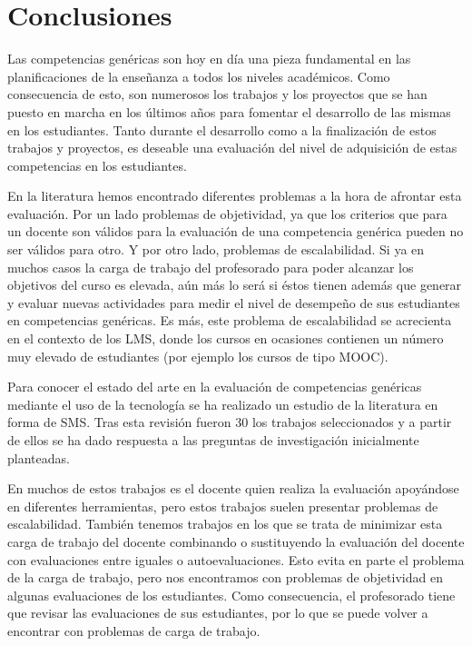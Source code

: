 \section{Conclusiones}

Las competencias genéricas son hoy en día una pieza fundamental en las planificaciones de la enseñanza a todos los niveles académicos. Como consecuencia de esto, son numerosos los trabajos y los proyectos que se han puesto en marcha en los últimos años para fomentar el desarrollo de las mismas en los estudiantes. Tanto durante el desarrollo como a la finalización de estos trabajos y proyectos, es deseable una evaluación del nivel de adquisición de estas competencias en los estudiantes.

En la literatura hemos encontrado diferentes problemas a la hora de afrontar esta evaluación. Por un lado problemas de objetividad, ya que los criterios que para un docente son válidos para la evaluación de una competencia genérica pueden no ser válidos para otro. Y por otro lado, problemas de escalabilidad. Si ya en muchos casos la carga de trabajo del profesorado para poder alcanzar los objetivos del curso es elevada, aún más lo será si éstos tienen además que generar y evaluar nuevas actividades para medir el nivel de desempeño de sus estudiantes en competencias genéricas. Es más, este problema de escalabilidad se acrecienta en el contexto de los LMS, donde los cursos en ocasiones contienen un número muy elevado de estudiantes (por ejemplo los cursos de tipo MOOC).

Para conocer el estado del arte en la evaluación de competencias genéricas mediante el uso de la tecnología se ha realizado un estudio de la literatura en forma de SMS. Tras esta revisión fueron 30 los trabajos seleccionados y a partir de ellos se ha dado respuesta a las preguntas de investigación inicialmente planteadas.

En muchos de estos trabajos es el docente quien realiza la evaluación apoyándose en diferentes herramientas, pero estos trabajos suelen presentar problemas de escalabilidad. También tenemos trabajos en los que se trata de minimizar esta carga de trabajo del docente combinando o sustituyendo la evaluación del docente con evaluaciones entre iguales o autoevaluaciones. Esto evita en parte el problema de la carga de trabajo, pero nos encontramos con problemas de objetividad en algunas evaluaciones de los estudiantes. Como consecuencia, el profesorado tiene que revisar las evaluaciones de sus estudiantes, por lo que se puede volver a encontrar con problemas de carga de trabajo.

